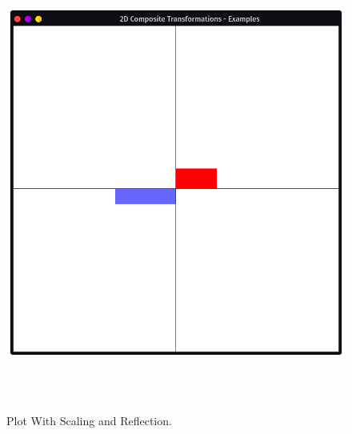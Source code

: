 \documentclass[12pt, a4]{article}
\begin{document}
\subsection*{}
\begin{figure}[h]
\centering
\caption{Plot With Scaling and Reflection.}
\includegraphics[height=15cm, width=15cm]{Outputs/Output-4.png}
\end{figure}

\newpage
\end{document}
